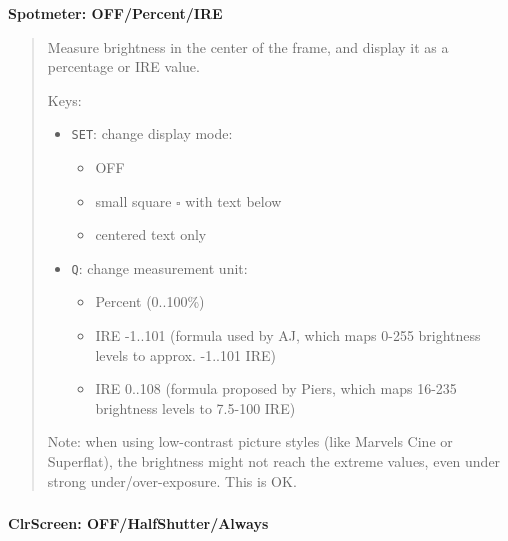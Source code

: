 \documentclass[a4paper,english]{article}
\begin{document}
\vspace{-10mm}\subsubsection*{}\label{spotmeter}
\textbf{Spotmeter: OFF/Percent/IRE}
%
\begin{quote}

Measure brightness in the center of the frame, and display it as a percentage or IRE value.

Keys:
%
\begin{itemize}

\item \texttt{SET}: change display mode:
%
\begin{itemize}

\item OFF

\item small square $\square$ with text below

\item centered text only

\end{itemize}

\item \texttt{Q}: change measurement unit:
%
\begin{itemize}

\item Percent (0..100\%)

\item IRE -1..101 (formula used by AJ, which maps 0-255 brightness levels to approx. -1..101 IRE)

\item IRE 0..108 (formula proposed by Piers, which maps 16-235 brightness levels to 7.5-100 IRE)

\end{itemize}

\end{itemize}

Note: when using low-contrast picture styles (like Marvels Cine or Superflat), the brightness might not reach the extreme values, even under strong under/over-exposure. This is OK.

\end{quote}
\vspace{-10mm}\subsubsection*{}\label{clean-liveview-display}
\textbf{ClrScreen: OFF/HalfShutter/Always}
\end{document}
